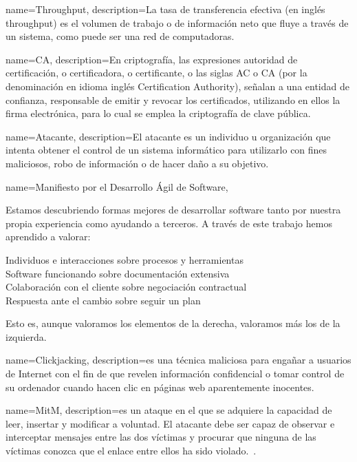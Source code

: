 {
    name=Throughput,
    description={La tasa de transferencia efectiva (en inglés throughput) es el volumen de trabajo o de información neto que fluye a través de
    un sistema, como puede ser una red de computadoras.}~\cite[Wikipedia]{wiki:throughput}
}

{
    name=CA,
    description={En criptografía, las expresiones autoridad de certificación, o certificadora, o certificante, o las siglas AC o CA (por la
    denominación en idioma inglés Certification Authority), señalan a una entidad de confianza, responsable de emitir y revocar los certificados,
    utilizando en ellos la firma electrónica, para lo cual se emplea la criptografía de clave pública.~\cite[Wikipedia]{wiki:ca}}
}

{
    name=Atacante,
    description={El atacante es un individuo u organización que intenta obtener el control de un sistema informático para utilizarlo con fines
    maliciosos, robo de información o de hacer daño a su objetivo.~\cite[Wikipedia]{wiki:atacante}}
}

{
    name={Manifiesto por el Desarrollo Ágil de Software},
  }
{
    \par Estamos descubriendo formas mejores de desarrollar software tanto por nuestra propia experiencia como ayudando a terceros. A través de este trabajo hemos aprendido a valorar:
    \par {\Large Individuos e interacciones} sobre procesos y herramientas\\
    {\Large Software funcionando} sobre documentación extensiva\\
    {\Large Colaboración con el cliente} sobre negociación contractual\\
    {\Large Respuesta ante el cambio} sobre seguir un plan
    \par Esto es, aunque valoramos los elementos de la derecha, valoramos más los de la izquierda.~\cite{ManifiestoAgil}
}


{
    name=Clickjacking,
    description={es una técnica maliciosa para engañar a usuarios de Internet con el fin de que revelen información confidencial o tomar control de su ordenador cuando hacen clic en
    páginas web aparentemente inocentes.~\cite[Wikipedia]{wiki:Clickjacking}}
}

{
    name=MitM,
    description={es un ataque en el que se adquiere la capacidad de leer, insertar y modificar a voluntad. El atacante debe ser capaz de observar e interceptar mensajes entre las dos víctimas y procurar que ninguna de las
    víctimas conozca que el enlace entre ellos ha sido violado.~\cite[Wikipedia]{wiki:mitm}}.
}

